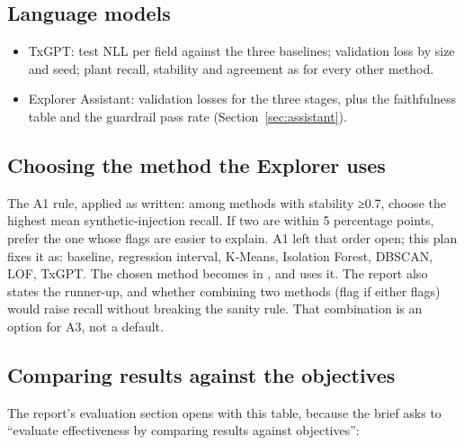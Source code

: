 \subsection{Language models}

\begin{itemize}
  \item TxGPT: test NLL per field against the three baselines; validation loss by size and seed;
    plant recall, stability and agreement as for every other method.
  \item Explorer Assistant: validation losses for the three stages, plus the faithfulness table
    and the guardrail pass rate (Section~\ref{sec:assistant}).
\end{itemize}

\subsection{Choosing the method the Explorer uses}
\label{sec:selection}

The A1 rule, applied as written: among methods with stability ≥0.7, choose the highest mean
synthetic-injection recall. If two are within 5 percentage points, prefer the one whose flags are
easier to explain. A1 left that order open; this plan fixes it as: baseline, regression interval,
K-Means, Isolation Forest, DBSCAN, LOF, TxGPT. The chosen method becomes  in
, and  uses it. The report also states the runner-up, and
whether combining two methods (flag if either flags) would raise recall without breaking the
sanity rule. That combination is an option for A3, not a default.

\subsection{Comparing results against the objectives}

The report's evaluation section opens with this table, because the brief asks to ``evaluate
effectiveness by comparing results against objectives'':

